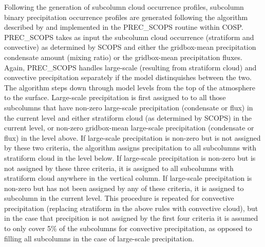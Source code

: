 Following the generation of subcolumn cloud occurrence profiles, subcolumn binary precipitation occurrence profiles are generated following the algorithm described by \cite{zhang_et_al_2010} and implemented in the PREC\_SCOPS routine within COSP. PREC\_SCOPS takes as input the subcolumn cloud occurrence (stratiform and convective) as determined by SCOPS and either the gridbox-mean precipitation condensate amount (mixing ratio) or the gridbox-mean precipitation fluxes. Again, PREC\_SCOPS handles large-scale (resulting from stratiform cloud) and convective precipitation separately if the model distinquishes between the two. The algorithm steps down through model levels from the top of the atmosphere to the surface. Large-scale precipitation is first assigned to to all those subcolumns that have non-zero large-scale precipitation (condensate or flux) in the current level and either stratiform cloud (as determined by SCOPS) in the current level, or non-zero gridbox-mean large-scale precipitation (condensate or flux) in the level above. If large-scale precipitation is non-zero but is not assigned by these two criteria, the algorithm assigns precipitation to all subcolumns with stratiform cloud in the level below. If large-scale precipitation is non-zero but is not assigned by these three criteria, it is assigned to all subcolumns with stratiform cloud anywhere in the vertical column. If large-scale precipitation is non-zero but has not been assigned by any of these criteria, it is assigned to subcolumn in the current level. This procedure is repeated for convective precipitation (replacing stratiform in the above rules with convective cloud), but in the case that precipition is not assigned by the first four criteria it is assumed to only cover 5\% of the subcolumns for convective precipitation, as opposed to filling all subcolumns in the case of large-scale precipitation.

